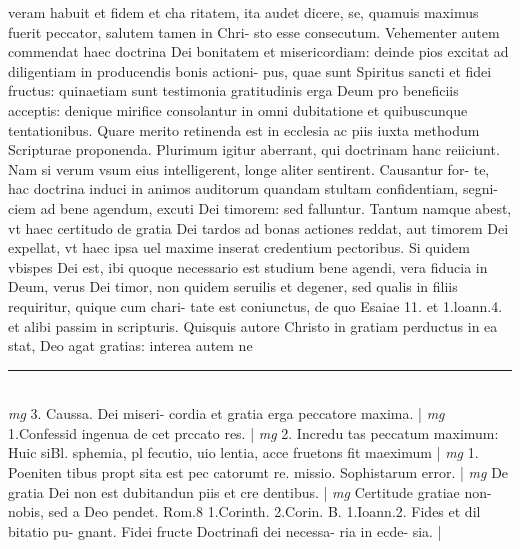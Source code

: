 \documentclass{article}
\begin{document}
\begin{pages}
veram habuit et fidem et cha ritatem, ita audet dicere, se, quamuis maximus fuerit peccator, salutem tamen in Chri- sto esse consecutum. Vehementer autem commendat haec doctrina Dei bonitatem et misericordiam: deinde pios excitat ad diligentiam in producendis bonis actioni- pus, quae sunt Spiritus sancti et fidei fructus: quinaetiam sunt testimonia gratitudinis erga Deum pro beneficiis acceptis: denique  mirifice consolantur in omni dubitatione et quibuscunque tentationibus. Quare merito retinenda est in ecclesia ac piis iuxta methodum Scripturae proponenda. Plurimum igitur aberrant, qui doctrinam hanc reiiciunt. Nam si verum vsum eius intelligerent, longe aliter sentirent. Causantur for- te, hac doctrina induci in animos auditorum quandam stultam confidentiam, segni- ciem ad bene agendum, excuti Dei timorem: sed falluntur. Tantum namque abest, vt haec certitudo de gratia Dei tardos ad bonas actiones reddat, aut timorem Dei expellat, vt haec ipsa uel maxime inserat credentium pectoribus. Si quidem vbispes Dei est, ibi quoque  necessario est studium bene agendi, vera fiducia in Deum, verus Dei timor, non quidem seruilis et degener, sed qualis in filiis requiritur, quique  cum chari- tate est coniunctus, de quo Esaiae 11. et 1.loann.4. et alibi passim in scripturis. Quisquis autore Christo in gratiam perductus in ea stat, Deo agat gratias: interea autem ne  \pend
\vspace{0.5cm}\noindent
\vspace{0.2cm}\rule{1cm}{0.2pt}\\ 
\hspace{0.2cm}\textit{mg}
\footnotesize 3. Caussa. Dei miseri- cordia et gratia erga peccatore maxima. 
\normalsize| 
\hspace{0.2cm}\textit{mg}
\footnotesize 1.Confessid ingenua de cet prccato res. 
\normalsize| 
\hspace{0.2cm}\textit{mg}
\footnotesize 2. Incredu tas peccatum maximum: Huic siBl. sphemia, pl fecutio, uio lentia, acce fruetons fit maeximum 
\normalsize| 
\hspace{0.2cm}\textit{mg}
\footnotesize 1. Poeniten tibus propt sita est pec catorumt re. missio. Sophistarum error. 
\normalsize| 
\hspace{0.2cm}\textit{mg}
\footnotesize De gratia Dei non est dubitandun piis et cre dentibus. 
\normalsize| 
\hspace{0.2cm}\textit{mg}
\footnotesize Certitude gratiae non- nobis, sed a Deo pendet. Rom.8 1.Corinth. 2.Corin. B. 1.Ioann.2. Fides et dil bitatio pu- gnant. Fidei fructe Doctrinafi dei necessa- ria in ecde- sia. 
\normalsize| 

\end{pages}
\end{document}
